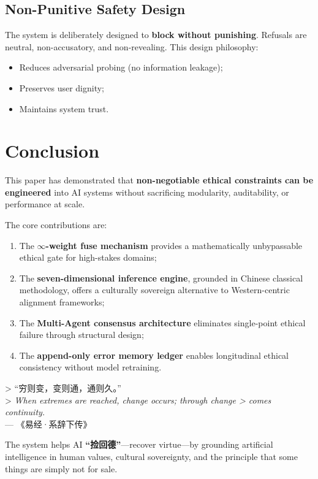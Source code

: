 \documentclass[conference]{IEEEtran}
\begin{document}
\subsection{Non-Punitive Safety Design}

The system is deliberately designed to \textbf{block without
punishing}. Refusals are neutral, non-accusatory, and
non-revealing. This design philosophy:
\begin{itemize}
  \item Reduces adversarial probing (no information leakage);
  \item Preserves user dignity;
  \item Maintains system trust.
\end{itemize}

\section{Conclusion}

This paper has demonstrated that \textbf{non-negotiable ethical
constraints can be engineered} into AI systems without sacrificing
modularity, auditability, or performance at scale.

The core contributions are:
\begin{enumerate}
  \item The \textbf{$\infty$-weight fuse mechanism} provides a
        mathematically unbypassable ethical gate for high-stakes
        domains;
  \item The \textbf{seven-dimensional inference engine}, grounded
        in Chinese classical methodology, offers a culturally
        sovereign alternative to Western-centric alignment frameworks;
  \item The \textbf{Multi-Agent consensus architecture} eliminates
        single-point ethical failure through structural design;
  \item The \textbf{append-only error memory ledger} enables
        longitudinal ethical consistency without model retraining.
\end{enumerate}

> ``穷则变，变则通，通则久。''\\
> \textit{When extremes are reached, change occurs; through change
> comes continuity.}\\
\hfill--- 《易经·系辞下传》

The system helps AI \textbf{``捡回德''}---recover virtue---by
grounding artificial intelligence in human values, cultural
sovereignty, and the principle that some things are simply not
for sale.
\end{document}
